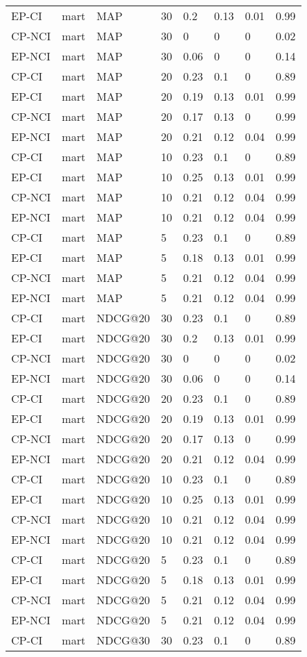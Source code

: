 \begin{landscape}
\begin{longtable}{|*{8}{l|}}
EP-CI&mart&MAP&30&0.2&0.13&0.01&0.99\\
CP-NCI&mart&MAP&30&0&0&0&0.02\\
EP-NCI&mart&MAP&30&0.06&0&0&0.14\\
\hline
CP-CI&mart&MAP&20&0.23&0.1&0&0.89\\
EP-CI&mart&MAP&20&0.19&0.13&0.01&0.99\\
CP-NCI&mart&MAP&20&0.17&0.13&0&0.99\\
EP-NCI&mart&MAP&20&0.21&0.12&0.04&0.99\\
\hline
CP-CI&mart&MAP&10&0.23&0.1&0&0.89\\
EP-CI&mart&MAP&10&0.25&0.13&0.01&0.99\\
CP-NCI&mart&MAP&10&0.21&0.12&0.04&0.99\\
EP-NCI&mart&MAP&10&0.21&0.12&0.04&0.99\\
\hline
CP-CI&mart&MAP&5&0.23&0.1&0&0.89\\
EP-CI&mart&MAP&5&0.18&0.13&0.01&0.99\\
CP-NCI&mart&MAP&5&0.21&0.12&0.04&0.99\\
EP-NCI&mart&MAP&5&0.21&0.12&0.04&0.99\\
\hline
CP-CI&mart&NDCG@20&30&0.23&0.1&0&0.89\\
EP-CI&mart&NDCG@20&30&0.2&0.13&0.01&0.99\\
CP-NCI&mart&NDCG@20&30&0&0&0&0.02\\
EP-NCI&mart&NDCG@20&30&0.06&0&0&0.14\\
\hline
CP-CI&mart&NDCG@20&20&0.23&0.1&0&0.89\\
EP-CI&mart&NDCG@20&20&0.19&0.13&0.01&0.99\\
CP-NCI&mart&NDCG@20&20&0.17&0.13&0&0.99\\
EP-NCI&mart&NDCG@20&20&0.21&0.12&0.04&0.99\\
\hline
CP-CI&mart&NDCG@20&10&0.23&0.1&0&0.89\\
EP-CI&mart&NDCG@20&10&0.25&0.13&0.01&0.99\\
CP-NCI&mart&NDCG@20&10&0.21&0.12&0.04&0.99\\
EP-NCI&mart&NDCG@20&10&0.21&0.12&0.04&0.99\\
\hline
CP-CI&mart&NDCG@20&5&0.23&0.1&0&0.89\\
EP-CI&mart&NDCG@20&5&0.18&0.13&0.01&0.99\\
CP-NCI&mart&NDCG@20&5&0.21&0.12&0.04&0.99\\
EP-NCI&mart&NDCG@20&5&0.21&0.12&0.04&0.99\\
\hline
CP-CI&mart&NDCG@30&30&0.23&0.1&0&0.89\\

\end{longtable}
\end{landscape}
